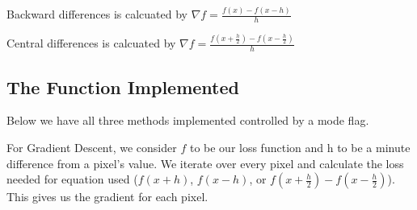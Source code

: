 \documentclass[letterpaper,10pt,english]{jupyterBook}
\begin{document}
\sphinxAtStartPar
Backward differences is calcuated by \(\nabla f = \frac{f(x) - f(x-h)}{h}\)

\sphinxAtStartPar
Central differences is calcuated by \(\nabla f = \frac{f(x+\frac{h}{2})-f(x-\frac{h}{2})}{h}\)


\subsection{The Function Implemented}
\label{\detokenize{finite_gradient:the-function-implemented}}
\sphinxAtStartPar
Below we have all three methods implemented controlled by a mode flag.

\sphinxAtStartPar
For Gradient Descent, we consider \(f\) to be our loss function and h to be a minute difference from a pixel’s value. We iterate over every pixel and calculate the loss needed for equation used (\(f(x+h)\), \(f(x-h)\), or \(f(x+\frac{h}{2})-f(x-\frac{h}{2})\)). This gives us the gradient for each pixel.
\end{document}
